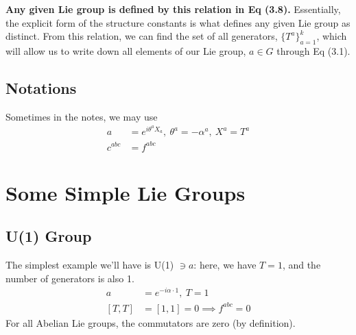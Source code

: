 \documentclass[a4paper, 11pt, normalem]{report}
\begin{document}
\textbf{Any given Lie group is defined by this relation in Eq (3.8).}
Essentially, the explicit form of the structure constants is what defines any given Lie group as distinct.
From this relation, we can find the set of all generators, $\{T^a\}^k_{a=1}$, which will allow us to write down all elements of our Lie group, $a\in G$ through Eq (3.1).

\subsection{Notations}
Sometimes in the notes, we may use
\begin{align}
    a &= e^{i\theta^a X_a},~ \theta^a = -\alpha^a,~ X^a = T^a \\
    c^{abc} &=  f^{abc}
\end{align}

\section{Some Simple Lie Groups}
\subsection{U(1) Group}
The simplest example we'll have is U(1) $\ni a$: here, we have $T=1$, and the number of generators is also 1.
        \begin{align}
            a &= e^{-i\alpha\cdot1},~ T=1 \\
            [T,T] &= [1,1] = 0 \implies f^{abc} = 0
        \end{align}
        For all Abelian Lie groups, the commutators are zero (by definition).
\end{document}
